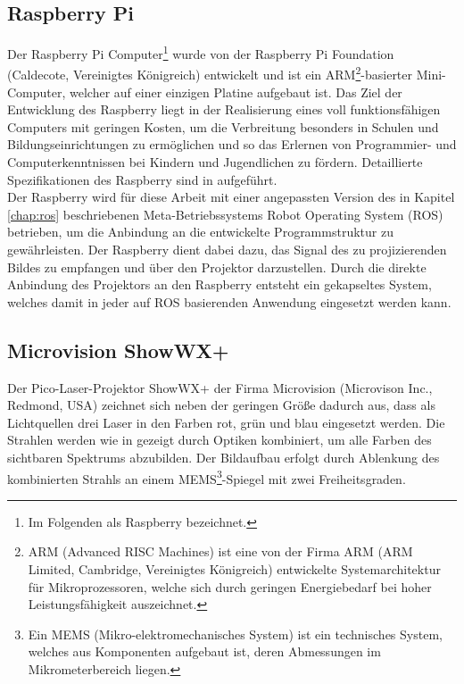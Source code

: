 
\subsection{Raspberry Pi\textsuperscript{\texttrademark}}
Der Raspberry Pi\textsuperscript{\texttrademark} Computer\footnote{Im Folgenden als Raspberry bezeichnet.} wurde von der Raspberry Pi Foundation (Caldecote, Vereinigtes Königreich) entwickelt und ist ein ARM\footnote{ARM (Advanced RISC Machines) ist eine von der Firma ARM (ARM Limited, Cambridge, Vereinigtes Königreich) entwickelte Systemarchitektur für Mikroprozessoren, welche sich durch geringen Energiebedarf bei hoher Leistungsfähigkeit auszeichnet.}-basierter Mini-Computer, welcher auf einer einzigen Platine aufgebaut ist. Das Ziel der Entwicklung des Raspberry liegt in der Realisierung eines voll funktionsfähigen Computers mit geringen Kosten, um die Verbreitung besonders in Schulen und Bildungseinrichtungen zu ermöglichen und so das Erlernen von Programmier- und Computerkenntnissen bei Kindern und Jugendlichen zu fördern. Detaillierte Spezifikationen des Raspberry sind in  aufgeführt.\\

Der Raspberry wird für diese Arbeit mit einer angepassten Version des in Kapitel \ref{chap:ros} beschriebenen Meta-Betriebssystems Robot Operating System (ROS) betrieben, um die Anbindung an die entwickelte Programmstruktur zu gewährleisten. Der Raspberry dient dabei dazu, das Signal des zu projizierenden Bildes zu empfangen und über den Projektor darzustellen. Durch die direkte Anbindung des Projektors an den Raspberry entsteht ein gekapseltes System, welches damit in jeder auf ROS basierenden Anwendung eingesetzt werden kann.


\subsection{Microvision ShowWX+\textsuperscript{\texttrademark}}%
\label{chap.projector}
Der Pico-Laser-Projektor ShowWX+\textsuperscript{\texttrademark} der Firma Microvision (Microvison Inc., Redmond, USA) zeichnet sich neben der geringen Größe dadurch aus, dass als Lichtquellen drei Laser in den Farben rot, grün und blau eingesetzt werden. Die Strahlen werden wie in  gezeigt durch Optiken kombiniert, um alle Farben des sichtbaren Spektrums abzubilden. Der Bildaufbau erfolgt durch Ablenkung des kombinierten Strahls an einem MEMS\footnote{Ein MEMS (Mikro-elektromechanisches System) ist ein technisches System, welches aus Komponenten aufgebaut ist, deren Abmessungen im Mikrometerbereich liegen.}-Spiegel mit zwei Freiheitsgraden.

